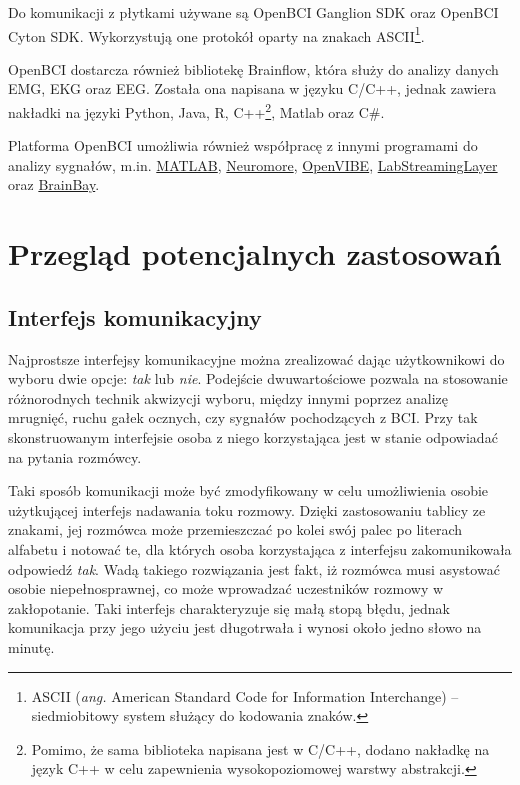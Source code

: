 \documentclass[skorowidz,skroty]{dyplomWEZUT}
\begin{document}
Do komunikacji z płytkami używane są OpenBCI Ganglion SDK oraz OpenBCI Cyton SDK. Wykorzystują one protokół oparty na znakach ASCII\footnote{ASCII (\textit{ang.} American Standard Code for Information Interchange) -- siedmiobitowy system służący do kodowania znaków.}.

OpenBCI dostarcza również bibliotekę Brainflow, która służy do analizy danych EMG, EKG oraz EEG\cite{markiv_software_brainflow}. Została ona napisana w języku C/C++, jednak zawiera nakładki na języki Python, Java, R, C++\footnote{Pomimo, że sama biblioteka napisana jest w C/C++, dodano nakładkę na język C++ w celu zapewnienia wysokopoziomowej warstwy abstrakcji.}, Matlab oraz C\#.

Platforma OpenBCI umożliwia również współpracę z innymi programami do analizy sygnałów, m.in. \href{https://www.mathworks.com/products/matlab.html}{MATLAB}, \href{https://www.neuromore.com/}{Neuromore}, \href{http://openvibe.inria.fr/}{OpenVIBE}, \href{https://github.com/sccn/labstreaminglayer}{LabStreamingLayer} oraz \href{http://www.shifz.org/brainbay/}{BrainBay}.

\section{Przegląd potencjalnych zastosowań}
\subsection{Interfejs komunikacyjny}
Najprostsze interfejsy komunikacyjne można zrealizować dając użytkownikowi do wyboru dwie opcje: \textit{tak} lub \textit{nie}. Podejście dwuwartościowe pozwala na stosowanie różnorodnych technik akwizycji wyboru, między innymi poprzez analizę mrugnięć, ruchu gałek ocznych, czy sygnałów pochodzących z BCI. Przy tak skonstruowanym interfejsie osoba z niego korzystająca jest w stanie odpowiadać na pytania rozmówcy.

Taki sposób komunikacji może być zmodyfikowany w celu umożliwienia osobie użytkującej interfejs nadawania toku rozmowy. Dzięki zastosowaniu tablicy ze znakami, jej rozmówca może przemieszczać  po kolei swój palec po literach alfabetu i notować te, dla których osoba korzystająca z interfejsu zakomunikowała odpowiedź \textit{tak}. Wadą takiego rozwiązania jest fakt, iż rozmówca musi asystować osobie niepełnosprawnej, co może wprowadzać uczestników rozmowy w zakłopotanie. Taki interfejs charakteryzuje się małą stopą błędu, jednak komunikacja przy jego użyciu jest długotrwała i wynosi około jedno słowo na minutę\cite{bci_trends}.
\end{document}

